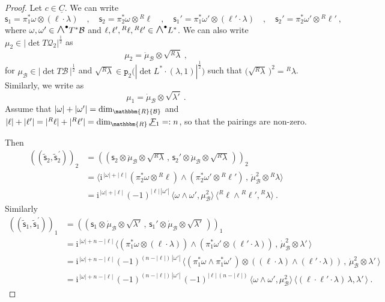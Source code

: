 \documentclass[a4paper, reqno, 11pt]{amsart}
\numberwithin{equation}{section}
\theoremstyle{definition}
\newcommand{\ip}[1]{\langle #1 \rangle}
\newcommand{\red}[1]{\underline{#1}}
\newcommand{\ii}{\mathrm{i}}
\newcommand{\rmp}{\mathtt{p}}
\newcommand{\IR}{\mathbbm{R}}
\newcommand{\cB}{{\mathcal B}}
\newcommand{\cQ}{{\mathcal Q}}
\newcommand{\cF}{{\mathcal F}}
\newcommand{\sfs}{{\mathsf{s}}}
\newcommand{\midwedge}{\text {\Large$\wedge$}}
\theoremstyle{remark}
\begin{document}
\begin{proof}
    Let $c\in \red C$. We can write $$\sfs_1 = \pi_1^*\omega \otimes(\ell \cdot \lambda) \quad ,  \quad \sfs_2 = \pi_2^*\omega \otimes {}^R \ell \quad , \quad \sfs_1' = \pi_1^*\omega' \otimes (\ell' \cdot \lambda) \quad , \quad \sfs_2' = \pi_2^*\omega' \otimes {}^R\ell' \ , $$ where $\omega,\omega'\in\midwedge^\bullet T^*\cB$ and $\ell,\ell',{}^R\ell,{}^R\ell'\in\midwedge^\bullet L^*$. We can also write $\mu_2 \in |\det T \cQ_2|^{\frac12}$ as $$\mu_2 = \ddot \mu_{\cB} \otimes \sqrt{{}^R \lambda}  \ , $$ for $\mu_\cB \in |\det T \cB\,|^{\frac12}$ and $\sqrt{{}^R \lambda} \in \rmp_2\big(|\det L^*\cdot (\lambda, 1)|^{\frac12}\big)$ such that $\big(\sqrt{{}^R \lambda}\,\big)^2 = {}^R\lambda$. Similarly, we write \smash{$\mu_1\in|\det T\cQ_1|^{\frac12}$} as $$\mu_1=\dot\mu_\cB\otimes\sqrt{\lambda'} \ . $$ Assume that $|\omega| + |\omega'| = \dim_\IR \cB$ and $|\ell|+|\ell'| = |{}^R \ell|+|{}^R\ell'| = \dim_\IR \red\cF{}_1 =: n$, so that the pairings are non-zero. 
    
    Then
    \begin{equation}
    \begin{aligned}
        (\!( \widetilde\sfs_2,\widetilde\sfs_2^{\,\prime} )\!)_2 &= (\!( \sfs_2 \otimes \ddot\mu_\cB\otimes\sqrt{{}^R\lambda}\,,\, \sfs_2' \otimes \ddot\mu_\cB\otimes\sqrt{{}^R\lambda} \,)\!)_2 \\[4pt]
        &= \ip{\ii^{\,|\omega| + |\ell|} \, (\pi_2^*\omega \otimes {}^R \ell) \wedge (\pi_2^* \omega' \otimes {}^R \ell') \,,\, \ddot\mu_\cB^2\otimes{}^R\lambda}\\[4pt]
        &=\ii^{\,|\omega| + |\ell|} \, (-1)^{|\ell|\,|\omega'|}\,\ip{\omega \wedge \omega',  \mu_\cB^2} \, \ip{{}^R \ell \wedge {}^R \ell', {}^R \lambda} \ .
    \end{aligned}
    \end{equation}
    Similarly
    \begin{equation}
        \begin{aligned}
      (\!( \widetilde\sfs_1,\widetilde\sfs_1^{\,\prime} )\!)_1 &=  (\!( \sfs_1 \otimes \dot \mu_\cB \otimes\sqrt{\lambda'}\,,\, \sfs_1' \otimes \dot \mu_\cB \otimes \sqrt{\lambda'}\, )\!)_1 \\[4pt] & = \ii^{\,|\omega| + n - |\ell|}\,\ip{(\pi_1^*\omega \otimes (\ell \cdot \lambda)) \wedge (\pi_1^*\omega' \otimes (\ell' \cdot \lambda)) \,,\, \dot \mu_\cB^2 \otimes \lambda'\,} \\[4pt]
            &= \ii^{\,|\omega| + n - |\ell|} \, (-1)^{(n-|\ell|)\,|\omega'|} \, \ip{(\pi_1^*\omega \wedge \pi_1^*\omega'\,) \otimes ((\ell \cdot \lambda) \wedge (\ell' \cdot \lambda))\,,\, \dot \mu_\cB^2 \otimes \lambda '\,}\\[4pt]
            &= \ii^{\,|\omega| + n - |\ell|} \, (-1)^{(n-|\ell|)\,|\omega'|} \, (-1)^{|\ell|\,(n-|\ell|)}\,\ip{\omega \wedge \omega' , \mu_\cB^2}\, \ip{(\ell \cdot \ell' \cdot \lambda)\,\lambda , \lambda '\,}\ .
        \end{aligned}
    \end{equation}
    

\end{proof}
\end{document}
